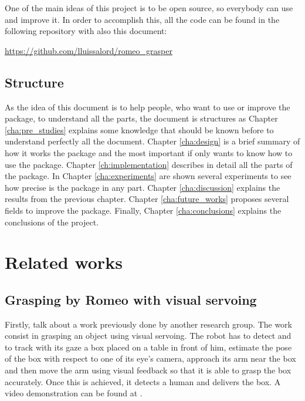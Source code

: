 \documentclass[12pt,a4paper,final,twoside,openright]{report}
\begin{document}
\vspace{-5pt}
One of the main ideas of this project is to be open source, so everybody can use and improve it. In order to accomplish this, all the code can be found in the following repository with also this document:

\url{https://github.com/lluissalord/romeo_grasper}

\vspace{-10pt}
\section{Structure}

\vspace{-5pt}
As the idea of this document is to help people, who want to use or improve the package, to understand all the parts, the document is structures as Chapter \ref{cha:pre_studies} explains some knowledge that should be known before to understand perfectly all the document. Chapter \ref{cha:design} is a brief summary of how it works the package and the most important if only wants to know how to use the package. Chapter \ref{ch:implementation} describes in detail all the parts of the package. In Chapter \ref{cha:experiments} are shown several experiments to see how precise is the package in any part. Chapter \ref{cha:discussion} explains the results from the previous chapter. Chapter \ref{cha:future_works} proposes several fields to improve the package. Finally, Chapter \ref{cha:conclusions} explains the conclusions of the project.

\chapter{Related works}

\section{Grasping by Romeo with visual servoing}
\label{sec:grasping_romeo_visual_servoing}

Firstly, talk about a work previously done by another research group. The work \cite{claudio:hal-01159882} consist in grasping an object using visual servoing. The robot has to detect and to track with its gaze a box placed on a table in front of him, estimate the pose of the box with respect to one of its eye's camera, approach its arm near the box and then move the arm using visual feedback so that it is able to grasp the box accurately. Once this is achieved, it detects a human and delivers the box. A video demonstration can be found at \cite{InriaLagadicgroup}.
\end{document}
